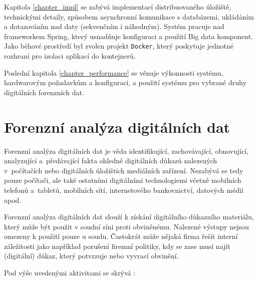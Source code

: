 Kapitola \ref{chapter_impl} se zabývá implementací distribuovaného úložiště,  technickými detaily, způsobem asynchronní komunikace s databázemi, ukládáním a dotazováním nad daty (sekvenčním i náhodným). Systém pracuje nad frameworkem Spring, který usnadňuje konfiguraci a použití Big data komponent. Jako běhové prostředí byl zvolen projekt \texttt{Docker}, který poskytuje jednotné rozhraní pro izolaci aplikací do kontejnerů.

Poslední kapitola \ref{chapter_performance} se věnuje výkonnosti systému, hardwarovým požadavkům a konfiguraci, a použití systému pro vybrané druhy digitálních forenzních dat.


\chapter{Forenzní analýza digitálních dat} \label{chapter1}
Forenzní analýza digitálních dat je věda identifikující, zachovávající, obnovující, analyzující a~předávající fakta ohledně digitálních důkazů nalezených v~počítačích nebo digitálních úložištích mediálních zařízení.
Nezabývá se tedy pouze počítači, ale také ostatními digitálními technologiemi včetně mobilních telefonů a~tabletů, mobilních sítí, internetového bankovnictví, datových médií apod.

Forenzní analýza digitálních dat slouží k získání digitálního důkazního materiálu, který může být použit v soudní síni proti obviněnému. Nalezené výstupy nejsou omezeny k použití pouze u soudu. Častokrát může nějaká firma řešit interní záležitosti jako například porušení firemní politiky, kdy se zase musí najít (digitální) důkaz, který potvrzuje nebo vyvrací obvinění.

Pod výše uvedenými aktivitami se skrývá \cite{whatIsDigFor}:

